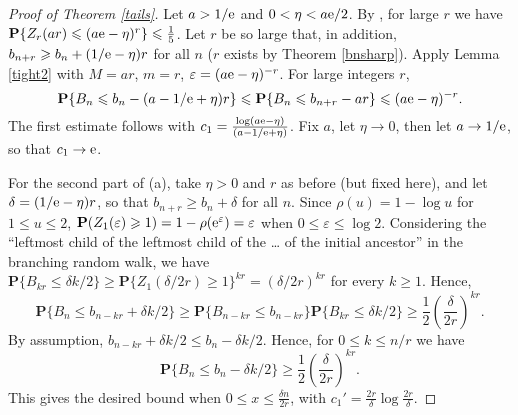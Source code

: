 \documentclass[12pt]{amsart}
\theoremstyle{remark}
\theoremstyle{plain}
\numberwithin{equation}{section}
\newcommand{\PPP}{\mathbf P}
\newcommand{\del}{\ensuremath{\delta}}
\newcommand{\eps}{\ensuremath{\varepsilon}}
\renewcommand{\(}{\left(}
\renewcommand{\)}{\right)}
\newcommand{\pfrac}[2]{\left(\frac{#1}{#2}\right)}
\newcommand{\er}{{\rm e}}  %
\renewcommand{\le}{\leqslant}
\renewcommand{\ge}{\geqslant}
\begin{document}
\begin{proof}[Proof of Theorem \ref{tails}]
Let $a>1/\er$ and $0<\eta<a\er/2$.
By \cite[Theorem 2]{BigChe}, for large $r$ we have
$\PPP \{ Z_r(ar) \le (a\er-\eta)^r \} \le \frac15$.
Let $r$ be so large that, in addition, $b_{n+r}\ge b_n+(1/\er-\eta)r$
for all $n$ ($r$ exists by Theorem \ref{bnsharp}).
Apply Lemma \ref{tight2} with $M=ar$, $m=r$,
$\eps=(a\er-\eta)^{-r}$.  For large integers $r$,
$$
\PPP \{ B_n \le b_n-(a-1/\er+\eta)r \} \le 
\PPP \{ B_n \le b_{n+r} - ar \} \le (a\er-\eta)^{-r}.
$$
The first estimate follows with $c_1=\frac{\log (a\er-\eta)}{(a-1/\er+\eta)}$.
Fix $a$, let $\eta\to 0$, then let $a\to 1/\er$, 
so that $c_1\to \er$.

For the second part of (a), take $\eta>0$ and $r$ as before (but fixed here),
 and let
$\del=(1/\er-\eta)r$, so that $b_{n+r}\ge b_n+\del$ for all $n$.
Since $\rho(u)=1-\log u$ for $1\le u\le 2$,
$\PPP(Z_1(\eps)\ge 1) = 1-\rho(\er^{\eps}) = \eps$ when $0\le \eps \le \log 2$.
Considering the ``leftmost child of the leftmost child of the \ldots
of the initial ancestor'' in the branching random
walk, we have
$\PPP \{ B_{kr} \le \del k/2 \} \ge \PPP \{ Z_1(\del/2r) \ge 1\}^{kr} 
= (\del/2r)^{kr}$ for every $k\ge 1$.  Hence,
$$
\PPP \{ B_n \le b_{n-kr} + \del k/2 \} \ge \PPP \{ B_{n-kr} \le b_{n-kr} \}
\PPP \{ B_{kr} \le \del k/2 \} \ge \frac12 \pfrac{\del}{2r}^{kr}.
$$
By assumption, $b_{n-kr}+\del k/2 \le b_n - \del k/2$.  Hence,
for $0\le k\le n/r$ we have
$$
\PPP \{ B_n \le b_n - \del k /2 \} \ge \frac12 \pfrac{\del}{2r}^{kr}.
$$
This gives the desired bound when $0\le x \le \frac{\delta n}{2r}$,
with $c_1'=\frac{2r}{\del} \log \frac{2r}{\delta}$.


\end{proof}
\end{document}
